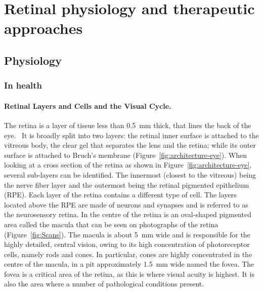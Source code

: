 \documentclass[12pt,a4paper]{journal}
\begin{document}
\section*{Retinal physiology and therapeutic approaches}

\subsection*{Physiology}

\subsubsection*{In health}

\paragraph*{Retinal Layers and Cells and the Visual Cycle.}

The retina is a layer of tissue less than \SI{0.5}{\mm} thick, that lines the back of the eye.~\cite{Gupta_2015}
It is broadly split into two layers: the retinal inner surface is attached to the vitreous body, the clear gel that separates the lens and the retina; while its outer surface is attached to Bruch's membrane (Figure~\ref{fig:architecture-eye}).
When looking at a cross section of the retina as shown in Figure~\ref{fig:architecture-eye}, several sub-layers can be identified. The innermost (closest to the vitreous) being the nerve fiber layer and the outermost being the retinal pigmented epithelium (RPE).
Each layer of the retina contains a different type of cell.
The layers located above the RPE are made of neurons and synapses and is referred to as the neurosensory retina.
In the centre of the retina is an oval-shaped pigmented area called the macula that can be seen on photographs of the retina (Figure~\ref{fig:Scans}).
The macula is about \SI{5}{\mm} wide and is responsible for the highly detailed, central vision, owing to its high concentration of photoreceptor cells, namely rods and cones.
In particular, cones are highly concentrated in the centre of the macula, in a pit approximately \SI{1.5}{\mm} wide named the fovea.
The fovea is a critical area of the retina, as this is where visual acuity is highest.
It is also the area where a number of pathological conditions present.
\end{document}
